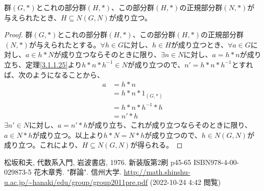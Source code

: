 \documentclass[dvipdfmx]{jsarticle}
\begin{document}
\begin{thm}\label{3.1.1.48}
群$(G,*)$とこれの部分群$(H,*)$、この部分群$(H,*)$の正規部分群$(N,*)$が与えられたとき、$H \subseteq N(G,N)$が成り立つ。
\end{thm}
\begin{proof}
群$(G,*)$とこれの部分群$(H,*)$、この部分群$(H,*)$の正規部分群$(N,*)$が与えられたとする。$\forall h \in G$に対し、$h \in H$が成り立つとき、$\forall a \in G$に対し、$a \in h*N$が成り立つならそのときに限り、$\exists n \in N$に対し、$a = h*n$が成り立ち、定理\ref{3.1.1.25}より$h*n*h^{- 1} \in N$が成り立つので、$n' = h*n*h^{- 1}$とすれば、次のようになることから、
\begin{align*}
a &= h*n\\
&= h*n*1_{(G,*)}\\
&= h*n*h^{- 1}*h\\
&= n'*h
\end{align*}
$\exists n' \in N$に対し、$a = n'*h$が成り立ち、これが成り立つならそのときに限り、$a \in N*h$が成り立つ。以上より$h*N = N*h$が成り立つので、$h \in N(G,N)$が成り立つ。これにより、$H \subseteq N(G,N)$が得られる。
\end{proof}
\begin{thebibliography}{50}
  松坂和夫, 代数系入門, 岩波書店, 1976. 新装版第2刷 p45-65 ISBN978-4-00-029873-5
  花木章秀. "群論". 信州大学. \url{http://math.shinshu-u.ac.jp/~hanaki/edu/group/group2011pre.pdf} (2022-10-24 4:42 閲覧)
\end{thebibliography}
\end{document}

